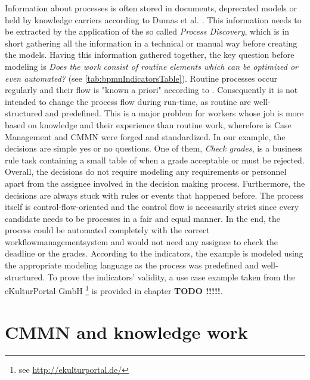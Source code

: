 Information about processes is often stored in documents, deprecated models or held by knowledge carriers according to Dumas et al. \cite{Dumas2013}. This information needs to be extracted by the application of the so called \textit{Process Discovery}, which is in short gathering all the information in a technical or manual way before creating the models. Having this information gathered together, the key question before modeling is \textit{Does the work consist of routine elements which can be optimized or even automated?} (see \ref{tab:bpmnIndicatorsTable}). Routine processes occur regularly and their flow is "known a priori" according to \cite{Zeising_2014}. Consequently it is not intended to change the process flow during run-time, as routine are well-structured and predefined. This is a major problem for workers whose job is more based on knowledge and their experience than routine work, wherefore is Case Management and CMMN were forged and standardized. 
In our example, the decisions are simple yes or no questions. One of them, \textit{Check grades}, is a business rule task containing a small table of when a grade acceptable or must be rejected. Overall, the decisions do not require modeling any requirements or personnel apart from the assignee involved in the decision making process. Furthermore, the decisions are always stuck with rules or events that happened before. The process itself is control-flow-oriented and the control flow is necessarily strict since every candidate needs to be processes in a fair and equal manner. In the end, the process could be automated completely with the correct workflowmanagementsystem and would not need any assignee to check the deadline or the grades. 
According to the indicators, the example is modeled using the appropriate modeling language as the process was predefined and well-structured. To prove the indicators' validity, a use case example taken from the eKulturPortal GmbH \footnote{see \url{http://ekulturportal.de/}} is provided in chapter \textbf{TODO !!!!!}. 

\section{CMMN and knowledge work}